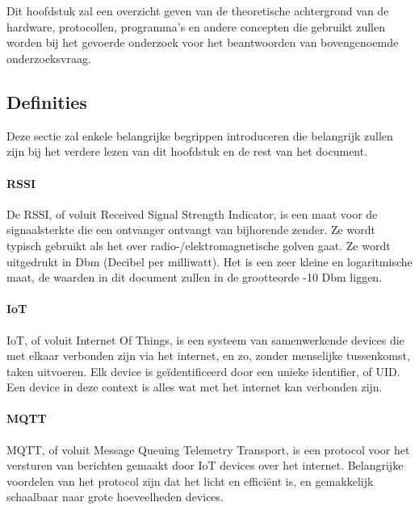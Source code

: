 \chapter{}
\label{ch:literatuurstudie}

Dit hoofdstuk zal een overzicht geven van de theoretische achtergrond van de hardware, protocollen, programma's en andere concepten die gebruikt zullen worden bij het gevoerde onderzoek voor het beantwoorden van bovengenoemde onderzoeksvraag.

\section{Definities}
Deze sectie zal enkele belangrijke begrippen introduceren die belangrijk zullen zijn bij het verdere lezen van dit hoofdstuk en de rest van het document.

\subsubsection{RSSI}
De RSSI, of voluit Received Signal Strength Indicator, is een maat voor de signaalsterkte die een ontvanger ontvangt van bijhorende zender. Ze wordt typisch gebruikt als het over radio-/elektromagnetische golven gaat.\autocite{Admin2022} Ze wordt uitgedrukt in Dbm (Decibel per milliwatt).\autocite{Tseard2016} Het is een zeer kleine en logaritmische maat, de waarden in dit document zullen in de grootteorde -10 Dbm liggen.

\subsubsection{IoT}
IoT, of voluit Internet Of Things, is een systeem van samenwerkende devices die met elkaar verbonden zijn via het internet, en zo, zonder menselijke tussenkomst, taken uitvoeren. Elk device is geïdentificeerd door een unieke identifier, of UID. Een device in deze context is alles wat met het internet kan verbonden zijn.\autocite{Gillis2022}

\subsubsection{MQTT}
MQTT, of voluit Message Queuing Telemetry Transport, is een protocol voor het versturen van berichten gemaakt door IoT devices over het internet. Belangrijke voordelen van het protocol zijn dat het licht en efficiënt is, en gemakkelijk schaalbaar naar grote hoeveelheden devices.\autocite{MQTT2022}

